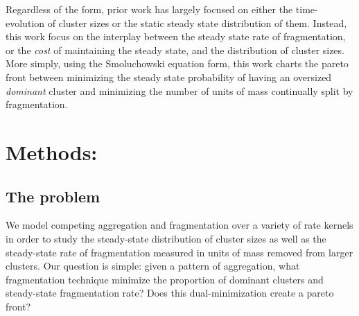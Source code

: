 \documentclass[fleqn,10pt]{wlscirep}
\begin{document}
Regardless of the form, prior work has largely focused on either the time-evolution  of cluster sizes or the static steady state distribution of them.
Instead, this work focus on the interplay between the steady state rate of fragmentation, or the \textit{cost} of maintaining the steady state, and the distribution of cluster sizes.
More simply, using the Smoluchowski equation form, this work charts the pareto front between minimizing the steady state probability of having an oversized \textit{dominant} cluster and minimizing the number of units of mass continually split by fragmentation.






\section{Methods: }




\subsection*{The problem}

We model competing aggregation and fragmentation over a variety of rate kernels in order to study the steady-state distribution of cluster sizes as well as the steady-state rate of fragmentation measured in units of mass removed from larger clusters.
Our question is simple: given a pattern of aggregation, what fragmentation technique minimize the proportion of dominant clusters and steady-state fragmentation rate?
Does this dual-minimization create a pareto front?

\end{document}
